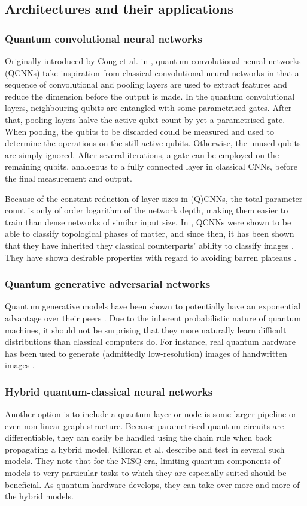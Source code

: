 \subsection{Architectures and their applications}
\subsubsection{Quantum convolutional neural networks}
Originally introduced by Cong et al. in \cite{cong2019}, quantum convolutional neural networks (QCNNs) take inspiration from classical convolutional neural networks in that a sequence of convolutional and pooling layers are used to extract features and reduce the dimension before the output is made. In the quantum convolutional layers, neighbouring qubits are entangled with some parametrised gates. After that, pooling layers halve the active qubit count by yet a parametrised gate. When pooling, the qubits to be discarded could be measured and used to determine the operations on the still active qubits. Otherwise, the unused qubits are simply ignored. After several iterations, a gate can be employed on the remaining qubits, analogous to a fully connected layer in classical CNNs, before the final measurement and output.

Because of the constant reduction of layer sizes in (Q)CNNs, the total parameter count is only of order logarithm of the network depth, making them easier to train than dense networks of similar input size. In \cite{cong2019}, QCNNs were shown to be able to classify topological phases of matter, and since then, it has been shown that they have inherited they classical counterparts' ability to classify images \cite{oh2020}. They have shown desirable properties with regard to avoiding barren plateaus \cite{pesah2021}.

\subsubsection{Quantum generative adversarial networks}
Quantum generative models have been shown to potentially have an exponential advantage over their peers \cite{gao2018}. Due to the inherent probabilistic nature of quantum machines, it should not be surprising that they more naturally learn difficult distributions than classical computers do. For instance, real quantum hardware has been used to generate (admittedly low-resolution) images of handwritten images \cite{huang2021}.


\subsubsection{Hybrid quantum-classical neural networks}
Another option is to include a quantum layer or node is some larger pipeline or even non-linear graph structure. Because parametrised quantum circuits are differentiable, they can easily be handled using the chain rule when back propagating a hybrid model. Killoran et al. describe and test in \cite{killoran2019} several such models. They note that for the NISQ era, limiting quantum components of models to very particular tasks to which they are especially suited should be beneficial. As quantum hardware develops, they can take over more and more of the hybrid models.

